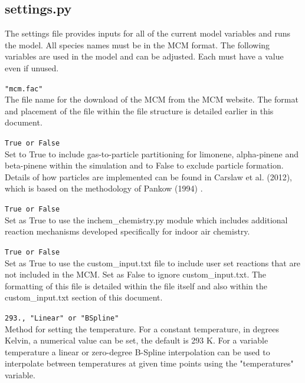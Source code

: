\documentclass[a4paper]{refart}
\begin{document}
\subsection{settings.py}\label{settings.py}
The settings file provides inputs for all of the current model variables and runs the model. All species names must be in the MCM format. The following variables are used in the model and can be adjusted. Each must have a value even if unused.

\texttt{"mcm.fac"}\\ 
The file name for the download of the MCM from the MCM website. The format and placement of the file within the file structure is detailed earlier in this document. 

\label{particles}
\texttt{True or False}\\
Set to True to include gas-to-particle partitioning for limonene, alpha-pinene and beta-pinene within the simulation and to False to exclude particle formation. Details of how particles are implemented can be found in Carslaw et al. (2012), which is based on the methodology of Pankow (1994) \cite{Carslaw2012,Pankow1994}.

\texttt{True or False}\\
Set as True to use the inchem\_chemistry.py module which includes additional reaction mechanisms developed specifically for indoor air chemistry. 

\texttt{True or False}\\
Set as True to use the custom\_input.txt file to include user set reactions that are not included in the MCM. Set as False to ignore custom\_input.txt. The formatting of this file is detailed within the file itself and also within the  custom\_input.txt section of this document.

\texttt{293., "Linear" or "BSpline"}\\
Method for setting the temperature. For a constant temperature, in degrees Kelvin, a numerical value can be set, the default is 293 K. For a variable temperature a linear or zero-degree B-Spline interpolation can be used to interpolate between temperatures at given time points using the "temperatures" variable.
\end{document}
